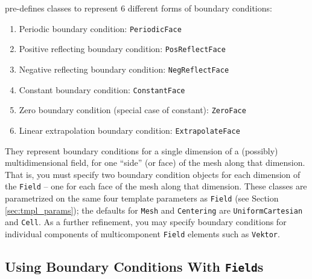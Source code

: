 \ippl pre-defines classes to represent 6 different forms of boundary conditions:
\begin{enumerate}
    \item Periodic boundary condition: \texttt{PeriodicFace}
    \item Positive reflecting boundary condition: \texttt{PosReflectFace}
    \item Negative reflecting boundary condition: \texttt{NegReflectFace}
    \item Constant boundary condition: \texttt{ConstantFace}
    \item Zero boundary condition (special case of constant): \texttt{ZeroFace}
    \item Linear extrapolation boundary condition: \texttt{ExtrapolateFace}
\end{enumerate}

They represent boundary conditions for a single dimension of a (possibly) multidimensional field, for one ``side'' (or face) of the mesh along that dimension. That is, you must specify two boundary condition objects for each dimension of the \texttt{Field} -- one for each face of the mesh along that dimension. These classes are parametrized on the same four template parameters as \texttt{Field} (see Section \ref{sec:tmpl_params}); the defaults for \texttt{Mesh} and \texttt{Centering} are
\texttt{UniformCartesian} and \texttt{Cell}. As a
further refinement, you may specify boundary conditions for individual components of multicomponent \texttt{Field} elements such as \texttt{Vektor}.

\subsection{Using Boundary Conditions With \texttt{Field}s}

